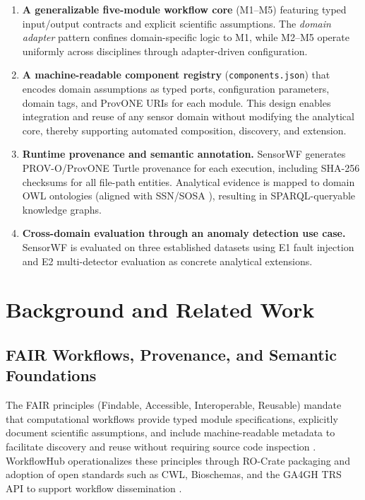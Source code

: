 \documentclass[conference]{IEEEtran}
\begin{document}
\begin{enumerate}
  \item \textbf{A generalizable five-module workflow core} (M1--M5) featuring typed input/output contracts and explicit scientific assumptions. The \emph{domain adapter} pattern confines domain-specific logic to M1, while M2--M5 operate uniformly across disciplines through adapter-driven configuration.

  \item \textbf{A machine-readable component registry} (\texttt{components.json}) that encodes domain assumptions as typed ports, configuration parameters, domain tags, and ProvONE URIs for each module. This design enables integration and reuse of any sensor domain without modifying the analytical core, thereby supporting automated composition, discovery, and extension.

  \item \textbf{Runtime provenance and semantic annotation.} SensorWF generates PROV-O/ProvONE Turtle provenance for each execution, including SHA-256 checksums for all file-path entities. Analytical evidence is mapped to domain OWL ontologies (aligned with SSN/SOSA \cite{haller2019ssn,compton2012ssn}), resulting in SPARQL-queryable knowledge graphs.

  \item \textbf{Cross-domain evaluation through an anomaly detection use case.} SensorWF is evaluated on three established datasets using E1 fault injection and E2 multi-detector evaluation as concrete analytical extensions.
  \end{enumerate}



\section{Background and Related Work}
\label{sec:background}

\subsection{FAIR Workflows, Provenance, and Semantic Foundations}

The FAIR principles (Findable, Accessible, Interoperable, Reusable) mandate that computational workflows provide typed module specifications, explicitly document scientific assumptions, and include machine-readable metadata to facilitate discovery and reuse without requiring source code inspection \cite{wilkinson2016fair,garijo2022fair}. WorkflowHub operationalizes these principles through RO-Crate packaging and adoption of open standards such as CWL, Bioschemas, and the GA4GH TRS API to support workflow dissemination \cite{gustafsson2025workflowhub}.
\end{document}
